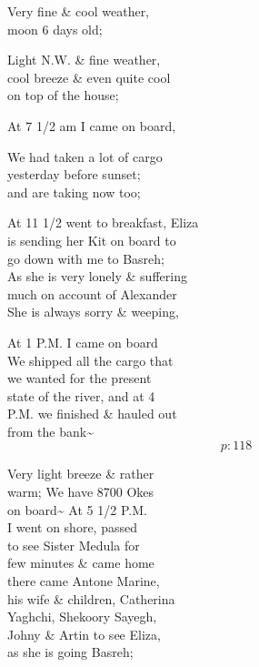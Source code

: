 \documentclass{report}
\begin{document}
	\par{
 	Very fine \& cool weather,\ \\moon 6 days old;\ \\
	}

	\par{
 	Light N.W. \& fine weather,\ \\cool breeze \& even quite cool\ \\on top of the house;\ \\
	}

	\par{
 	At 7 1/2 am I came on board,\ \\
	}

	\par{
 	We had taken a lot of cargo\ \\yesterday before sunset;\ \\and are taking now too;\ \\
	}

	\par{
 	At 11 1/2 went to breakfast, Eliza\ \\is sending her Kit on board to\ \\go down with me to Basreh;\ \\As she is very lonely \& suffering\ \\much on account of Alexander\ \\She is always sorry \& weeping,\ \\
	}

	\par{
 	At 1 P.M. I came on board\ \\We shipped all the cargo that\ \\we wanted for the present\ \\state of the river, and at 4\ \\P.M. we finished \& hauled out\ \\from the bank\~{}\ \\
  \[p: 118 \]

	}






	\par{
 	Very light breeze \& rather\ \\warm; We have 8700 Okes\ \\on board\~{} At 5 1/2 P.M.\ \\I went on shore, passed\ \\to see Sister Medula for\ \\few minutes \& came home\ \\there came Antone Marine,\ \\his wife \& children, Catherina\ \\Yaghchi, Shekoory Sayegh,\ \\Johny \& Artin to see Eliza,\ \\as she is going Basreh;\ \\
	}
\end{document}
